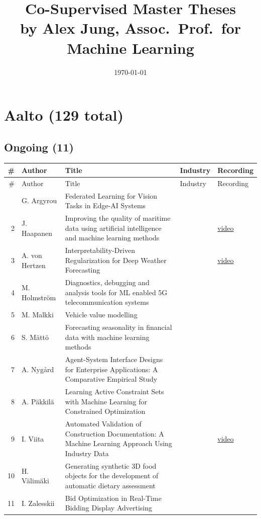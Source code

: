 \documentclass[11pt,a4paper]{article}
\title{Co-Supervised Master Theses \\[0.3em] \large by Alex Jung, Assoc.\ Prof.\ for Machine Learning}
\author{}
\date{\today}
\begin{document}
\maketitle

\section*{Aalto (129 total)}

\subsection*{Ongoing (11)}

\begin{longtable}{@{}r p{3cm} p{6.5cm} p{2.8cm} p{2cm}@{}}
\toprule
\# & Author & Title & Industry & Recording \\
\midrule
\endfirsthead
\toprule
\# & Author & Title & Industry & Recording \\
\midrule
\endhead
\bottomrule
\endfoot
1 & G. Argyrou & Federated Learning for Vision Tasks in Edge-AI Systems &  &  \\
2 & J. Haapanen & Improving the quality of maritime data using artificial intelligence and machine learning methods &  & \href{https://youtu.be/9K9sDFP4VDQ}{video} \\
3 & A. von Hertzen & Interpretability-Driven Regularization for Deep Weather Forecasting &  & \href{https://youtu.be/2ySKxhEJjGw}{video} \\
4 & M. Holmström & Diagnostics, debugging and analysis tools for ML enabled 5G telecommunication systems &  &  \\
5 & M. Malkki & Vehicle value modelling &  &  \\
6 & S. Mättö & Forecasting seasonality in financial data with machine learning methods &  &  \\
7 & A. Nygård & Agent-System Interface Designs for Enterprise Applications: A Comparative Empirical Study &  &  \\
8 & A. Päkkilä & Learning Active Constraint Sets with Machine Learning for Constrained Optimization &  &  \\
9 & I. Viita & Automated Validation of Construction Documentation: A Machine Learning Approach Using Industry Data &  & \href{https://youtu.be/gxk9WxDpx_Y}{video} \\
10 & H. Välimäki & Generating synthetic 3D food objects for the development of automatic dietary assessment &  &  \\
11 & I. Zalesskii & Bid Optimization in Real-Time Bidding Display Advertising &  &  \\
\end{longtable}
\end{document}
